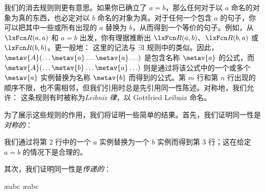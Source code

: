 我们的消去规则则更有意思。如果你已确立了 $a=b$，那么任何对于以 $a$ 命名的对象为真的东西，也必定对以 $b$ 命名的对象为真。对于任何一个包含 $a$ 的句子，你可以把其中一些或所有出现的 $a$ 替换为 $b$，从而得到一个等价的句子。例如，从 $\atom{R}{a,a}$ 和 $a = b$ 出发，你有理据推断出 $\atom{R}{a,b}$、$\atom{R}{b,a}$ 或 $\atom{R}{b,b}$。更一般地：
这里的记法与 $\exists$I 规则中的类似。因此，$\metav{A}(\ldots \metav{a} \ldots \metav{a}\ldots)$ 是包含名称 $\metav{a}$ 的公式，而 $\metav{A}(\ldots \metav{b} \ldots \metav{a}\ldots)$ 则是通过将该公式中的一个或多个 $\metav{a}$ 实例替换为名称 $\metav{b}$ 而得到的公式。第 $m$ 行和第 $n$ 行出现的顺序不限，也不需相邻，但我们引用时总是先引用同一性陈述。对称地，我们允许：
这条规则有时被称为\emph{Leibniz 律}，以 Gottfried Leibniz 命名。

为了展示这些规则的作用，我们将证明一些简单的结果。首先，我们证明同一性是\emph{对称的}：


\begin{fitchproof}
	\open
		\AS
	\close
\end{fitchproof}


我们通过将第 $2$ 行中的一个 $a$ 实例替换为一个 $b$ 实例而得到第 $3$ 行；这在给定 $a= b$ 的情况下是合理的。

其次，我们证明同一性是\emph{传递的}：


\begin{fitchproof}
	\open
		\AS
		\ae{abc}
		\ae{abc}
	\close
\end{fitchproof}


